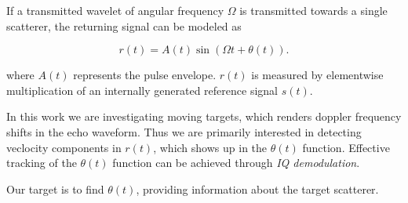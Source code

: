 If a transmitted wavelet of angular frequency $\Omega$ is transmitted towards a single scatterer, the returning signal can be modeled as

\begin{equation}
	r(t) = A(t)\sin(\Omega t + \theta(t)).
\end{equation}

where $A(t)$ represents the pulse envelope. $r(t)$ is measured by elementwise multiplication of an internally generated reference signal $s(t)$.  


In this work we are investigating moving targets, which renders doppler frequency shifts in the echo waveform. Thus we are primarily interested in detecting veclocity components in $r(t)$, which shows up in the $\theta(t)$ function. Effective tracking of the $\theta(t)$ function can be achieved through \emph{IQ demodulation}. 


Our target is to find $\theta(t)$, providing information about the target scatterer.  







